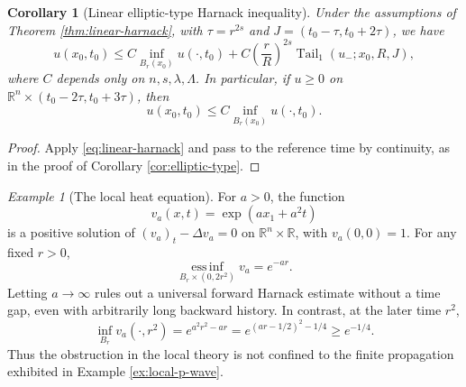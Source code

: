 \documentclass[10pt]{amsart}
\theoremstyle{plain}
\newtheorem{corollary}[lemma]{Corollary}
\theoremstyle{definition}
\theoremstyle{remark}
\newtheorem{example}[lemma]{Example}
\numberwithin{equation}{section}
\newcommand{\R}{\mathbb R}
\begin{document}
\begin{corollary}[Linear elliptic-type Harnack inequality]
\label{cor:linear-elliptic-type}
Under the assumptions of Theorem \ref{thm:linear-harnack}, with
$\tau=r^{2s}$ and $J=(t_0-\tau,t_0+2\tau)$, we have
\begin{equation}\label{eq:linear-same-time-harnack}
u(x_0,t_0)
\le C\inf_{B_r(x_0)}u(\cdot,t_0)
+C\left(\frac rR\right)^{2s}
\operatorname{Tail}_1(u_-;x_0,R,J),
\end{equation}
where $C$ depends only on $n,s,\lambda,\Lambda$. In particular, if
$u\ge0$ on $\R^n\times(t_0-2\tau,t_0+3\tau)$, then
\[
u(x_0,t_0)\le C\inf_{B_r(x_0)}u(\cdot,t_0).
\]

\end{corollary}

\begin{proof}
Apply \eqref{eq:linear-harnack} and pass to the reference time by
continuity, as in the proof of Corollary \ref{cor:elliptic-type}.
\end{proof}

\begin{example}[The local heat equation]\label{ex:local-heat}
For $a>0$, the function
\[
v_a(x,t)=\exp(a x_1+a^2t)
\]
is a positive solution of $(v_a)_t-\Delta v_a=0$ on
$\R^n\times\R$, with $v_a(0,0)=1$. For any fixed $r>0$,
\[
\operatorname*{ess\,inf}_{B_r\times(0,2r^2)}v_a=e^{-ar}.
\]
Letting $a\to\infty$ rules out a universal forward Harnack estimate
without a time gap, even with arbitrarily long backward history.
In contrast, at the later time $r^2$,
\[
\inf_{B_r}v_a(\cdot,r^2)
=e^{a^2r^2-ar}
=e^{(ar-1/2)^2-1/4}\ge e^{-1/4}.
\]
Thus the obstruction in the local theory is not confined to the
finite propagation exhibited in Example \ref{ex:local-p-wave}.
\end{example}
\end{document}
